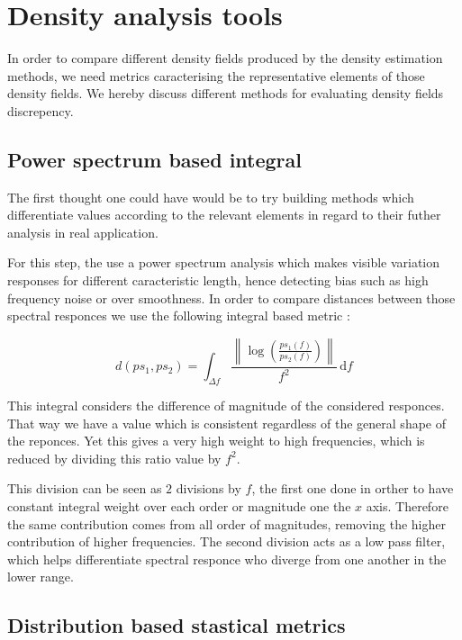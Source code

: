 \documentclass[10pt,a4paper,twoside,twocolumn]{article}
\begin{document}
\section{Density analysis tools}

In order to compare different density fields produced by the density estimation
methods, we need metrics caracterising the representative elements of those
density fields. We hereby discuss different methods for evaluating density
fields discrepency.

\subsection{Power spectrum based integral}

The first thought one could have would be to try building methods which
differentiate values according to the relevant elements in regard to their
futher analysis in real application.

For this step, the use a power spectrum analysis which makes visible variation
responses for different caracteristic length, hence detecting bias such as high
frequency noise or over smoothness. In order to compare distances between those
spectral responces we use the following integral based metric :

\begin{equation}
	d(ps_1, ps_2) = \int_{\Delta f}\frac{\left\|\log\left(\frac{ps_1(f)}{ps_2(f)}
										\right)\right\|}{f^2}\, \mathrm df
	\label{eq:psd_metric}
\end{equation}

This integral considers the difference of magnitude of the considered responces.
That way we have a value which is consistent regardless of the general shape of
the reponces. Yet this gives a very high weight to high frequencies, which is
reduced by dividing this ratio value by $f^2$.

This division can be seen as $2$ divisions by $f$, the first one done in orther
to have constant integral weight over each order or magnitude one the $x$ axis.
Therefore the same contribution comes from all order of magnitudes, removing the
higher contribution of higher frequencies. The second division acts as a low
pass filter, which helps differentiate spectral responce who diverge from one
another in the lower range.

\subsection{Distribution based stastical metrics}
\end{document}
